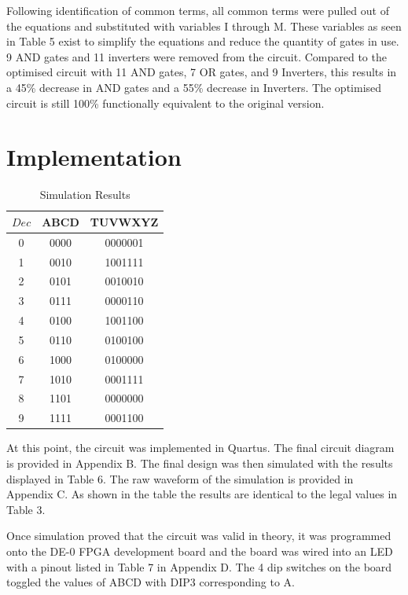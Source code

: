 \documentclass[12pt,letterpaper,titlepage]{article}
\begin{document}
\begin{raggedright}
Following identification of common terms, all common terms were pulled out of the equations and substituted with variables I through M. These variables as seen in Table 5 exist to simplify the equations and reduce the quantity of gates in use. 9 AND gates and 11 inverters were removed from the circuit. Compared to the optimised circuit with 11 AND gates, 7 OR gates, and 9 Inverters, this results in a 45\% decrease in AND gates and a 55\% decrease in Inverters. The optimised circuit is still 100\% functionally equivalent to the original version.

\bigskip\bigskip
\bigskip\bigskip

\section{Implementation}
\begin{table}
\centering
\begin{tabular}{|c||c|c|}\hline
$Dec$ & ABCD & TUVWXYZ\\\hline\hline
0         & 0000 & 0000001\\\hline
1         & 0010 & 1001111\\\hline
2         & 0101 & 0010010\\\hline
3         & 0111 & 0000110\\\hline
4         & 0100 & 1001100\\\hline
5         & 0110 & 0100100\\\hline
6         & 1000 & 0100000\\\hline
7         & 1010 & 0001111\\\hline
8         & 1101 & 0000000\\\hline
9         & 1111 & 0001100\\\hline
\end{tabular}
\caption{Simulation Results}
\end{table}

At this point, the circuit was implemented in Quartus. The final circuit diagram is provided in Appendix B. The final design was then simulated with the results displayed in Table 6. The raw waveform of the simulation is provided in Appendix C. As shown in the table the results are identical to the legal values in Table 3. 

Once simulation proved that the circuit was valid in theory, it was programmed onto the DE-0 FPGA development board and the board was wired into an LED with a pinout listed in Table 7 in Appendix D. The 4 dip switches on the board toggled the values of ABCD with DIP3 corresponding to A.




\end{raggedright}
\end{document}
